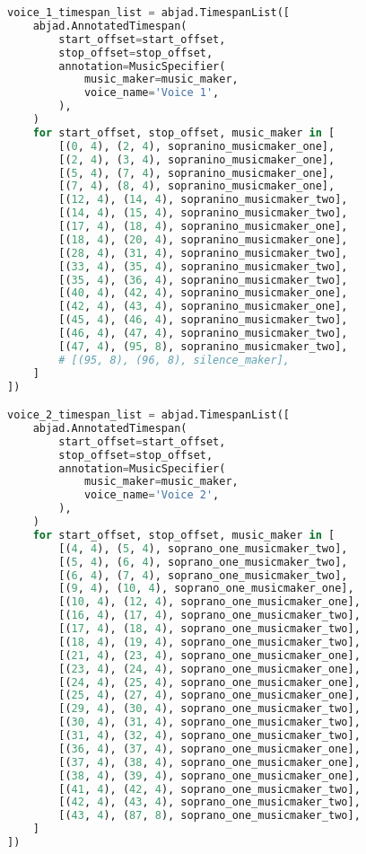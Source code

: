 \begin{lstlisting}[language=Python, caption=Invocation Source Code]
voice_1_timespan_list = abjad.TimespanList([
    abjad.AnnotatedTimespan(
        start_offset=start_offset,
        stop_offset=stop_offset,
        annotation=MusicSpecifier(
            music_maker=music_maker,
            voice_name='Voice 1',
        ),
    )
    for start_offset, stop_offset, music_maker in [
        [(0, 4), (2, 4), sopranino_musicmaker_one],
        [(2, 4), (3, 4), sopranino_musicmaker_one],
        [(5, 4), (7, 4), sopranino_musicmaker_one],
        [(7, 4), (8, 4), sopranino_musicmaker_one],
        [(12, 4), (14, 4), sopranino_musicmaker_two],
        [(14, 4), (15, 4), sopranino_musicmaker_two],
        [(17, 4), (18, 4), sopranino_musicmaker_one],
        [(18, 4), (20, 4), sopranino_musicmaker_one],
        [(28, 4), (31, 4), sopranino_musicmaker_two],
        [(33, 4), (35, 4), sopranino_musicmaker_two],
        [(35, 4), (36, 4), sopranino_musicmaker_two],
        [(40, 4), (42, 4), sopranino_musicmaker_one],
        [(42, 4), (43, 4), sopranino_musicmaker_one],
        [(45, 4), (46, 4), sopranino_musicmaker_two],
        [(46, 4), (47, 4), sopranino_musicmaker_two],
        [(47, 4), (95, 8), sopranino_musicmaker_two],
        # [(95, 8), (96, 8), silence_maker],
    ]
])

voice_2_timespan_list = abjad.TimespanList([
    abjad.AnnotatedTimespan(
        start_offset=start_offset,
        stop_offset=stop_offset,
        annotation=MusicSpecifier(
            music_maker=music_maker,
            voice_name='Voice 2',
        ),
    )
    for start_offset, stop_offset, music_maker in [
        [(4, 4), (5, 4), soprano_one_musicmaker_two],
        [(5, 4), (6, 4), soprano_one_musicmaker_two],
        [(6, 4), (7, 4), soprano_one_musicmaker_two],
        [(9, 4), (10, 4), soprano_one_musicmaker_one],
        [(10, 4), (12, 4), soprano_one_musicmaker_one],
        [(16, 4), (17, 4), soprano_one_musicmaker_two],
        [(17, 4), (18, 4), soprano_one_musicmaker_two],
        [(18, 4), (19, 4), soprano_one_musicmaker_two],
        [(21, 4), (23, 4), soprano_one_musicmaker_one],
        [(23, 4), (24, 4), soprano_one_musicmaker_one],
        [(24, 4), (25, 4), soprano_one_musicmaker_one],
        [(25, 4), (27, 4), soprano_one_musicmaker_one],
        [(29, 4), (30, 4), soprano_one_musicmaker_two],
        [(30, 4), (31, 4), soprano_one_musicmaker_two],
        [(31, 4), (32, 4), soprano_one_musicmaker_two],
        [(36, 4), (37, 4), soprano_one_musicmaker_one],
        [(37, 4), (38, 4), soprano_one_musicmaker_one],
        [(38, 4), (39, 4), soprano_one_musicmaker_one],
        [(41, 4), (42, 4), soprano_one_musicmaker_two],
        [(42, 4), (43, 4), soprano_one_musicmaker_two],
        [(43, 4), (87, 8), soprano_one_musicmaker_two],
    ]
])


\end{lstlisting}
